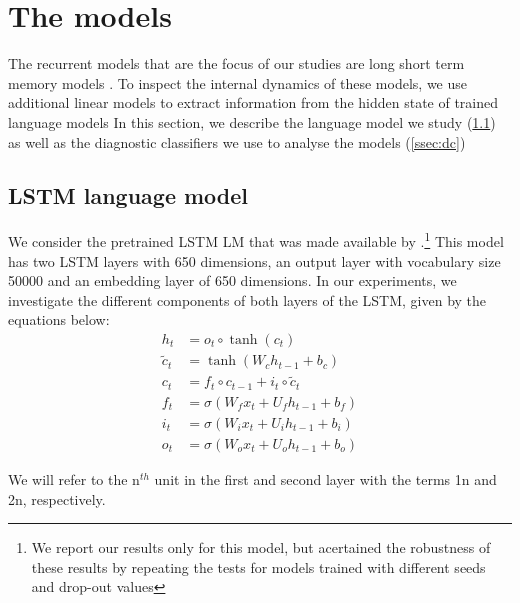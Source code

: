
\section{The models}

The recurrent models that are the focus of our studies are long short term memory models \cite[LSTMs]{Hochreiter:Schmidhuber:1997}.
To inspect the internal dynamics of these models, we use additional linear models to extract information from the hidden state of trained language models \cite[see, e.g.\ ]{Adi:etal:2017,Hupkes:etal:2017} 
In this section, we describe the language model we study (\ref{ssec:lstm_lm}) as well as the diagnostic classifiers we use to analyse the models (\ref{ssec:dc})

\subsection{LSTM language model}\label{ssec:lstm_lm}

We consider the pretrained LSTM LM that was made available by \cite{Gulordava:etal:2018}.\footnote{We report our results only for this model, but acertained the robustness of these results by repeating the tests for models trained with different seeds and drop-out values}
This model has two LSTM layers with 650 dimensions, an output layer with vocabulary size 50000 and an embedding layer of 650 dimensions.
In our experiments, we investigate the different components of both layers of the LSTM, given by the equations below:
\begin{align}
    h_t & = o_t\circ \tanh(c_t)\\ 
     \widetilde{c}_t & = \tanh(W_ch_{t-1} + b_c)\\
     c_t & = f_t\circ c_{t-1} + i_t\circ \widetilde{c}_t\\
     f_t & = \sigma(W_fx_t + U_fh_{t-1} + b_f) \\
     i_t & = \sigma(W_ix_t + U_ih_{t-1} + b_i) \\
     o_t & = \sigma(W_ox_t + U_oh_{t-1} + b_o)
\end{align}

We will refer to the n$^{th}$ unit in the first and second layer with the terms \unit{1}{n} and \unit{2}{n}, respectively.


